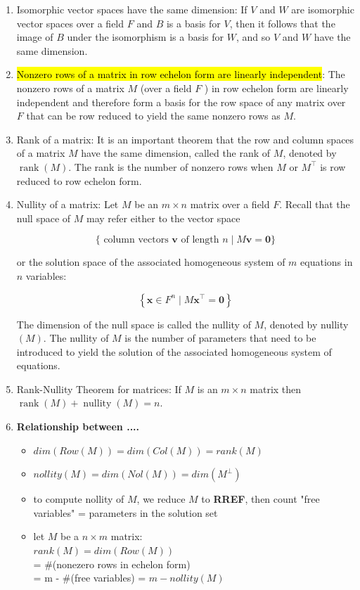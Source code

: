 \documentclass{article}
\begin{document}
\begin{enumerate}
        \item Isomorphic vector spaces have the same dimension: If $V$ and $W$ are isomorphic vector spaces over a field $F$ and $B$ is a basis for $V$, then it follows that the image of $B$ under the isomorphism is a basis for $W$, and so $V$ and $W$ have the same dimension.

        \item \hl{Nonzero rows of a matrix in row echelon form are linearly independent}: The nonzero rows of a matrix $M$ (over a field $F$ ) in row echelon form are linearly independent and therefore form a basis for the row space of any matrix over $F$ that can be row reduced to yield the same nonzero rows as $M$.

        \item Rank of a matrix: It is an important theorem that the row and column spaces of a matrix $M$ have the same dimension, called the rank of $M$, denoted by $\operatorname{rank}(M)$. The rank is the number of nonzero rows when $M$ or $M^{\top}$ is row reduced to row echelon form.

        \item Nullity of a matrix: Let $M$ be an $m \times n$ matrix over a field $F$. Recall that the null space of $M$ may refer either to the vector space

        $$
        \{\text { column vectors } \mathbf{v} \text { of length } n \mid M \mathbf{v}=\mathbf{0}\}
        $$

        or the solution space of the associated homogeneous system of $m$ equations in $n$ variables:

        $$
        \left\{\mathbf{x} \in F^{n} \mid M \mathbf{x}^{\top}=\mathbf{0}\right\}
        $$

        The dimension of the null space is called the nullity of $M$, denoted by nullity $(M)$. The nullity of $M$ is the number of parameters that need to be introduced to yield the solution of the associated homogeneous system of equations.

        \item Rank-Nullity Theorem for matrices: If $M$ is an $m \times n$ matrix then $\operatorname{rank}(M)+\operatorname{nullity}(M)=n$.


        \item \textbf{Relationship between ....}
            \begin{itemize}
                \item $dim(Row(M)) = dim(Col(M)) = rank(M)$
                \item $nollity(M) = dim(Nol(M)) = dim(M^{\perp})$
                \item to compute nollity of $M$, we reduce $M$ to \textbf{RREF}, then count "free variables" = parameters in the solution set

                \item let $M$ be a $n \times m$ matrix:\\
                $rank(M) = dim(Row(M))$\\
                = \#(nonezero rows in echelon form)\\
                = m - \#(free variables) = $m - nollity(M)$
            \end{itemize}
    \end{enumerate}
\end{document}

